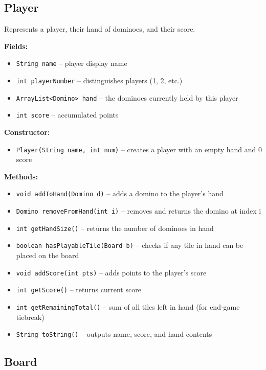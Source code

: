 \documentclass[11pt,a4paper]{article}
\begin{document}
\subsection{Player}

Represents a player, their hand of dominoes, and their score.

\textbf{Fields:}
\begin{itemize}[nosep]
  \item \texttt{String name} -- player display name
  \item \texttt{int playerNumber} -- distinguishes players (1, 2, etc.)
  \item \texttt{ArrayList<Domino> hand} -- the dominoes currently held by this player
  \item \texttt{int score} -- accumulated points
\end{itemize}

\textbf{Constructor:}
\begin{itemize}[nosep]
  \item \texttt{Player(String name, int num)} -- creates a player with an empty hand and 0 score
\end{itemize}

\textbf{Methods:}
\begin{itemize}[nosep]
  \item \texttt{void addToHand(Domino d)} -- adds a domino to the player's hand
  \item \texttt{Domino removeFromHand(int i)} -- removes and returns the domino at index i
  \item \texttt{int getHandSize()} -- returns the number of dominoes in hand
  \item \texttt{boolean hasPlayableTile(Board b)} -- checks if any tile in hand can be placed on the board
  \item \texttt{void addScore(int pts)} -- adds points to the player's score
  \item \texttt{int getScore()} -- returns current score
  \item \texttt{int getRemainingTotal()} -- sum of all tiles left in hand (for end-game tiebreak)
  \item \texttt{String toString()} -- outputs name, score, and hand contents
\end{itemize}

\subsection{Board}
\end{document}
